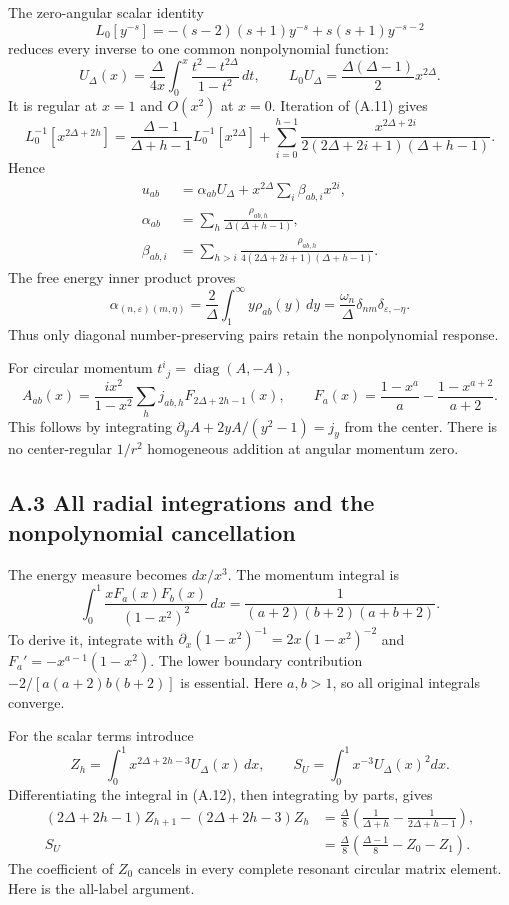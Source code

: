 \documentclass[a4paper,11pt]{article}
\numberwithin{equation}{section}
\begin{document}
The zero-angular scalar identity \[
L_0[y^{-s}]=-(s-2)(s+1)y^{-s}+s(s+1)y^{-s-2}
\tag{A.11}
\] reduces every inverse to one common nonpolynomial function: \[
U_\Delta(x)=\frac{\Delta}{4x}
\int_0^x\frac{t^2-t^{2\Delta}}{1-t^2}\,dt,\qquad
L_0U_\Delta=\frac{\Delta(\Delta-1)}2x^{2\Delta}.
\tag{A.12}
\] It is regular at \(x=1\) and \(O(x^2)\) at \(x=0\). Iteration of (A.11) gives \[
L_0^{-1}[x^{2\Delta+2h}]
=\frac{\Delta-1}{\Delta+h-1}L_0^{-1}[x^{2\Delta}]
+\sum_{i=0}^{h-1}
\frac{x^{2\Delta+2i}}{2(2\Delta+2i+1)(\Delta+h-1)} .
\tag{A.13}
\] Hence \[
\begin{aligned}
u_{ab}&=\alpha_{ab}U_\Delta
+x^{2\Delta}\sum_i\beta_{ab,i}x^{2i},\\
\alpha_{ab}&=\sum_h\frac{\rho_{ab,h}}{\Delta(\Delta+h-1)},\\
\beta_{ab,i}&=\sum_{h>i}
\frac{\rho_{ab,h}}{4(2\Delta+2i+1)(\Delta+h-1)}.
\end{aligned}
\tag{A.14}
\] The free energy inner product proves \[
\alpha_{(n,\varepsilon)(m,\eta)}
=\frac2\Delta\int_1^\infty y\rho_{ab}(y)\,dy
=\frac{\omega_n}{\Delta}\delta_{nm}\delta_{\varepsilon,-\eta}.
\tag{A.15}
\] Thus only diagonal number-preserving pairs retain the nonpolynomial response.

For circular momentum \(t^i{}_j=\operatorname{diag}(A,-A)\), \[
A_{ab}(x)=\frac{ix^2}{1-x^2}
\sum_hj_{ab,h}F_{2\Delta+2h-1}(x),\qquad
F_a(x)=\frac{1-x^a}{a}-\frac{1-x^{a+2}}{a+2}.
\tag{A.16}
\] This follows by integrating \(\partial_yA+2yA/(y^2-1)=j_y\) from the center. There is no center-regular \(1/r^2\) homogeneous addition at angular momentum zero.

\hypertarget{a.3-all-radial-integrations-and-the-nonpolynomial-cancellation}{%
\subsection{A.3 All radial integrations and the nonpolynomial cancellation}\label{a.3-all-radial-integrations-and-the-nonpolynomial-cancellation}}

The energy measure becomes \(dx/x^3\). The momentum integral is \[
\int_0^1\frac{xF_a(x)F_b(x)}{(1-x^2)^2}\,dx
=\frac1{(a+2)(b+2)(a+b+2)}.
\tag{A.17}
\] To derive it, integrate with \(\partial_x(1-x^2)^{-1}=2x(1-x^2)^{-2}\) and \(F_a'=-x^{a-1}(1-x^2)\). The lower boundary contribution \(-2/[a(a+2)b(b+2)]\) is essential. Here \(a,b>1\), so all original integrals converge.

For the scalar terms introduce \[
Z_h=\int_0^1x^{2\Delta+2h-3}U_\Delta(x)\,dx,\qquad
S_U=\int_0^1x^{-3}U_\Delta(x)^2dx .
\] Differentiating the integral in (A.12), then integrating by parts, gives \[
\begin{aligned}
(2\Delta+2h-1)Z_{h+1}-(2\Delta+2h-3)Z_h
&=\frac{\Delta}{8}
\left(\frac1{\Delta+h}-\frac1{2\Delta+h-1}\right),\\
S_U&=\frac{\Delta}{8}
\left(\frac{\Delta-1}{8}-Z_0-Z_1\right).
\end{aligned}
\tag{A.18}
\] The coefficient of \(Z_0\) cancels in every complete resonant circular matrix element. Here is the all-label argument.
\end{document}
